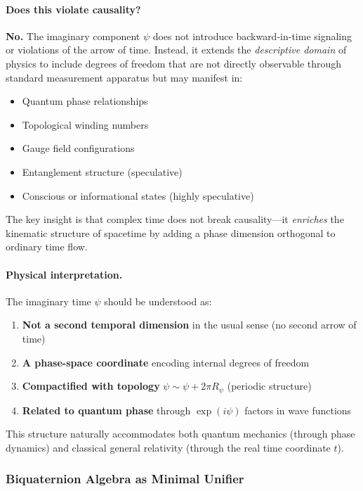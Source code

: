 \paragraph{Does this violate causality?} \textbf{No.} The imaginary component $\psi$ does not introduce backward-in-time signaling or violations of the arrow of time. Instead, it extends the \emph{descriptive domain} of physics to include degrees of freedom that are not directly observable through standard measurement apparatus but may manifest in:
\begin{itemize}
\item Quantum phase relationships
\item Topological winding numbers
\item Gauge field configurations
\item Entanglement structure (speculative)
\item Conscious or informational states (highly speculative)
\end{itemize}

The key insight is that complex time does not break causality—it \emph{enriches} the kinematic structure of spacetime by adding a phase dimension orthogonal to ordinary time flow.

\paragraph{Physical interpretation.} The imaginary time $\psi$ should be understood as:
\begin{enumerate}
\item \textbf{Not a second temporal dimension} in the usual sense (no second arrow of time)
\item \textbf{A phase-space coordinate} encoding internal degrees of freedom
\item \textbf{Compactified with topology} $\psi \sim \psi + 2\pi R_\psi$ (periodic structure)
\item \textbf{Related to quantum phase} through $\exp(i\psi)$ factors in wave functions
\end{enumerate}

This structure naturally accommodates both quantum mechanics (through phase dynamics) and classical general relativity (through the real time coordinate $t$).

\subsubsection{Biquaternion Algebra as Minimal Unifier}

